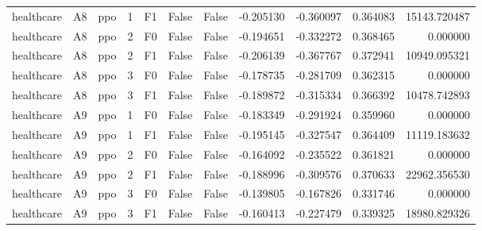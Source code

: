 \begin{tabular}{lllrlllrrrr}
healthcare &      A8 &       ppo &     1 &  F1 &           False &            False & -0.205130 & -0.360097 & 0.364083 &     15143.720487 \\
healthcare &      A8 &       ppo &     2 &  F0 &           False &            False & -0.194651 & -0.332272 & 0.368465 &         0.000000 \\
healthcare &      A8 &       ppo &     2 &  F1 &           False &            False & -0.206139 & -0.367767 & 0.372941 &     10949.095321 \\
healthcare &      A8 &       ppo &     3 &  F0 &           False &            False & -0.178735 & -0.281709 & 0.362315 &         0.000000 \\
healthcare &      A8 &       ppo &     3 &  F1 &           False &            False & -0.189872 & -0.315334 & 0.366392 &     10478.742893 \\
healthcare &      A9 &       ppo &     1 &  F0 &           False &            False & -0.183349 & -0.291924 & 0.359960 &         0.000000 \\
healthcare &      A9 &       ppo &     1 &  F1 &           False &            False & -0.195145 & -0.327547 & 0.364409 &     11119.183632 \\
healthcare &      A9 &       ppo &     2 &  F0 &           False &            False & -0.164092 & -0.235522 & 0.361821 &         0.000000 \\
healthcare &      A9 &       ppo &     2 &  F1 &           False &            False & -0.188996 & -0.309576 & 0.370633 &     22962.356530 \\
healthcare &      A9 &       ppo &     3 &  F0 &           False &            False & -0.139805 & -0.167826 & 0.331746 &         0.000000 \\
healthcare &      A9 &       ppo &     3 &  F1 &           False &            False & -0.160413 & -0.227479 & 0.339325 &     18980.829326 \\
\bottomrule
\end{tabular}
